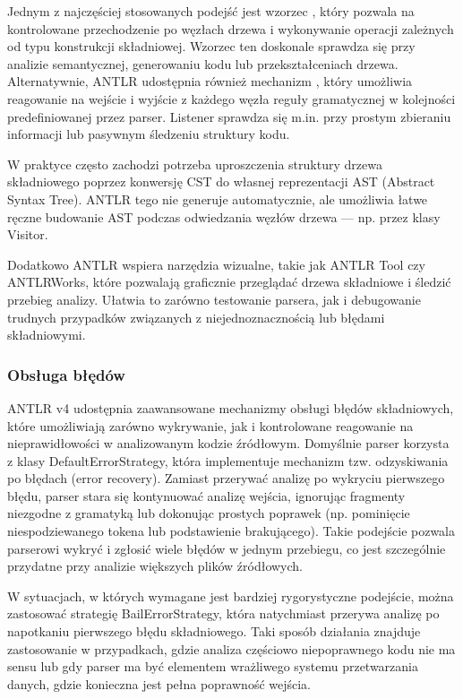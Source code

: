 \documentclass[12pt,twoside]{article}
\begin{document}
Jednym z najczęściej stosowanych podejść jest wzorzec , który pozwala na kontrolowane przechodzenie po węzłach drzewa i wykonywanie operacji zależnych od typu konstrukcji składniowej. Wzorzec ten doskonale sprawdza się przy analizie semantycznej, generowaniu kodu lub przekształceniach drzewa. Alternatywnie, ANTLR udostępnia również mechanizm , który umożliwia reagowanie na wejście i wyjście z każdego węzła reguły gramatycznej w kolejności predefiniowanej przez parser. Listener sprawdza się m.in. przy prostym zbieraniu informacji lub pasywnym śledzeniu struktury kodu.

W praktyce często zachodzi potrzeba uproszczenia struktury drzewa składniowego poprzez konwersję CST do własnej reprezentacji AST (Abstract Syntax Tree). ANTLR tego nie generuje automatycznie, ale umożliwia łatwe ręczne budowanie AST podczas odwiedzania węzłów drzewa — np. przez klasy Visitor.

Dodatkowo ANTLR wspiera narzędzia wizualne, takie jak ANTLR Tool czy ANTLRWorks, które pozwalają graficznie przeglądać drzewa składniowe i śledzić przebieg analizy. Ułatwia to zarówno testowanie parsera, jak i debugowanie trudnych przypadków związanych z niejednoznacznością lub błędami składniowymi.

\subsubsection{Obsługa błędów}
ANTLR v4 udostępnia zaawansowane mechanizmy obsługi błędów składniowych, które umożliwiają zarówno wykrywanie, jak i kontrolowane reagowanie na nieprawidłowości w analizowanym kodzie źródłowym. Domyślnie parser korzysta z klasy DefaultErrorStrategy, która implementuje mechanizm tzw. odzyskiwania po błędach (error recovery). Zamiast przerywać analizę po wykryciu pierwszego błędu, parser stara się kontynuować analizę wejścia, ignorując fragmenty niezgodne z gramatyką lub dokonując prostych poprawek (np. pominięcie niespodziewanego tokena lub podstawienie brakującego). Takie podejście pozwala parserowi wykryć i zgłosić wiele błędów w jednym przebiegu, co jest szczególnie przydatne przy analizie większych plików źródłowych.

W sytuacjach, w których wymagane jest bardziej rygorystyczne podejście, można zastosować strategię BailErrorStrategy, która natychmiast przerywa analizę po napotkaniu pierwszego błędu składniowego. Taki sposób działania znajduje zastosowanie w przypadkach, gdzie analiza częściowo niepoprawnego kodu nie ma sensu lub gdy parser ma być elementem wrażliwego systemu przetwarzania danych, gdzie konieczna jest pełna poprawność wejścia.
\end{document}
